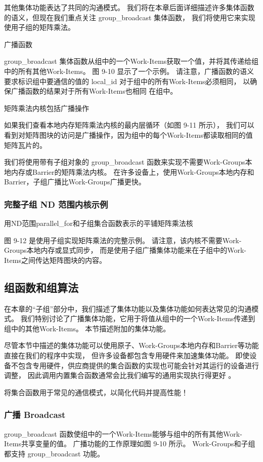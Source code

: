 其他集体功能表达了共同的沟通模式。 
我们将在本章后面详细描述许多集体函数的语义，但现在我们重点关注 group\_broadcast 集体函数，
我们将使用它来实现使用子组的矩阵乘法。

{\color{red} 广播函数}

group\_broadcast 集体函数从组中的一个Work-Items获取一个值，并将其传递给组中的所有其他Work-Items。 
图 9-10 显示了一个示例。 
请注意，广播函数的语义要求标识组中要通信的值的 local\_id 对于组中的所有Work-Items必须相同，
以确保广播函数的结果对于所有Work-Items也相同 在组中。

{\color{red} 矩阵乘法内核包括广播操作}

如果我们查看本地内存矩阵乘法内核的最内层循环（如图 9-11 所示），
我们可以看到对矩阵图块的访问是广播操作，因为组中的每个Work-Items都读取相同的值 矩阵瓦片的。

我们将使用带有子组对象的 group\_broadcast 函数来实现不需要Work-Groups本地内存或Barrier的矩阵乘法内核。 
在许多设备上，使用Work-Groups本地内存和Barrier，子组广播比Work-Groups广播更快。

\subsubsection{完整子组 ND 范围内核示例}
{\color{red} 用ND范围parallel\_for和子组集合函数表示的平铺矩阵乘法核}

图 9-12 是使用子组实现矩阵乘法的完整示例。 
请注意，该内核不需要Work-Groups本地内存或显式同步，
而是使用子组广播集体功能来在子组中的Work-Items之间传达矩阵图块的内容。

\subsection{组函数和组算法}
在本章的“子组”部分中，我们描述了集体功能以及集体功能如何表达常见的沟通模式。 
我们特别讨论了广播集体功能，它用于将值从组中的一个Work-Items传递到组中的其他Work-Items。 本节描述附加的集体功能。

尽管本节中描述的集体功能可以使用原子、Work-Groups本地内存和Barrier等功能直接在我们的程序中实现，
但许多设备都包含专用硬件来加速集体功能。 
即使设备不包含专用硬件，供应商提供的集合函数的实现也可能会针对其运行的设备进行调整，
因此调用内置集合函数通常会比我们编写的通用实现执行得更好 。

\begin{remark}
	将集合函数用于常见的通信模式，以简化代码并提高性能！
\end{remark}

\subsubsection{广播 Broadcast}
group\_broadcast 函数使组中的一个Work-Items能够与组中的所有其他Work-Items共享变量的值。 
广播功能的工作原理如图 9-10 所示。 Work-Groups和子组都支持 group\_broadcast 功能。

